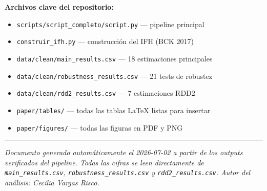 \documentclass[12pt, a4paper]{article}
\begin{document}
\bigskip
\noindent\textbf{Archivos clave del repositorio:}
\begin{itemize}[noitemsep]
  \item \texttt{scripts/script\_completo/script.py} --- pipeline principal
  \item \texttt{construir\_ifh.py} --- construcción del IFH (BCK 2017)
  \item \texttt{data/clean/main\_results.csv} --- 18 estimaciones principales
  \item \texttt{data/clean/robustness\_results.csv} --- 21 tests de robustez
  \item \texttt{data/clean/rdd2\_results.csv} --- 7 estimaciones RDD2
  \item \texttt{paper/tables/} --- todas las tablas LaTeX listas para insertar
  \item \texttt{paper/figures/} --- todas las figuras en PDF y PNG
\end{itemize}

\bigskip
\hrule
\bigskip
{\small\textit{Documento generado automáticamente el 2026-07-02 a partir de los
outputs verificados del pipeline. Todas las cifras se leen directamente de
\texttt{main\_results.csv}, \texttt{robustness\_results.csv} y
\texttt{rdd2\_results.csv}. Autor del análisis: Cecilia Vargas Risco.}}
\end{document}
